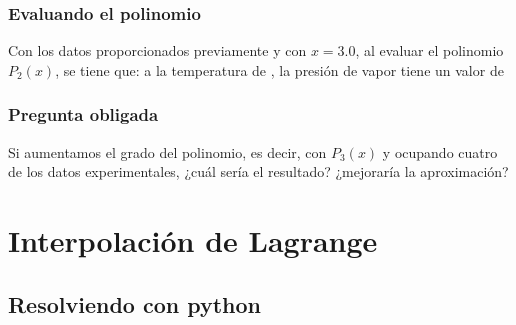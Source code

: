 \documentclass[12pt]{beamer}
\begin{document}
\begin{frame}
\frametitle{Evaluando el polinomio}
Con los datos proporcionados previamente y con $x = 3.0$, al evaluar el polinomio $P_{2} (x)$, se tiene que: \pause a la temperatura de , la presión de vapor tiene un valor de 
\end{frame}
\begin{frame}
\frametitle{Pregunta obligada}
Si aumentamos el grado del polinomio, es decir, con $P_{3} (x)$ y ocupando cuatro de los datos experimentales, \pause ¿cuál sería el resultado? \pause ¿mejoraría la aproximación?
\end{frame}

\section{Interpolación de Lagrange}
\subsection{Resolviendo con python}
\end{document}

